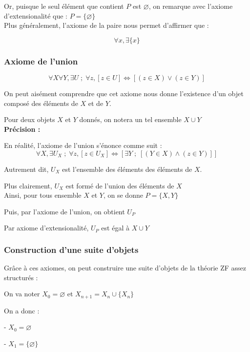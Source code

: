 \documentclass{article}
\begin{document}
Or, puisque le seul élément que contient $P$ est $\varnothing$, on remarque avec l'axiome d'extensionalité que : $P = \{ \varnothing \}$
\\

Plus généralement, l'axiome de la paire nous permet d'affirmer que :

$$\forall x, \exists \{ x \}$$

\subsubsection{Axiome de l'union}

$$\boxed{\forall X \forall Y, \exists U \; ; \; \forall z, [z \in U] \Leftrightarrow [(z \in X) \lor (z \in Y)]}$$

On peut aisément comprendre que cet axiome nous donne l'existence d'un objet composé des éléments de $X$ et de $Y$.

Pour deux objets $X$ et $Y$ donnés, on notera un tel ensemble $X \cup Y$
\\

\textbf{Précision :}

En réalité, l'axiome de l'union s'énonce comme suit :
$$\boxed{\forall X, \exists U_X \; ; \; \forall z, [z \in U_X] \Leftrightarrow [\exists Y \; ; \; [(Y \in X) \wedge (z \in Y)]]}$$

Autrement dit, $U_X$ est l'ensemble des éléments des éléments de $X$.

Plus clairement, $U_X$ est formé de l'union des éléments de $X$
\\

Ainsi, pour tous ensemble $X$ et $Y$, on se donne $P = \{X,Y\}$ 

Puis, par l'axiome de l'union, on obtient $U_P$ 

Par axiome d'extensionalité, $U_P$ est égal à $X \cup Y$

\subsubsection{Construction d'une suite d'objets}

Grâce à ces axiomes, on peut construire une suite d'objets de la théorie ZF assez structurés :

On va noter $X_0 = \varnothing$ et $X_{n+1} = X_n \cup \{X_n\}$

On a donc :

- $X_0 = \varnothing$

- $X_1 = \{\varnothing\}$
\end{document}
